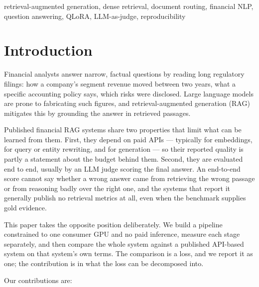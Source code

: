 \documentclass[conference]{IEEEtran}
\begin{document}
\begin{IEEEkeywords}
retrieval-augmented generation, dense retrieval, document routing, financial
NLP, question answering, QLoRA, LLM-as-judge, reproducibility
\end{IEEEkeywords}

\section{Introduction}
Financial analysts answer narrow, factual questions by reading long regulatory
filings: how a company's segment revenue moved between two years, what a
specific accounting policy says, which risks were disclosed. Large language
models are prone to fabricating such figures, and retrieval-augmented
generation (RAG)~\cite{lewis2020rag} mitigates this by grounding the answer in
retrieved passages.

Published financial RAG systems share two properties that limit what can be
learned from them. First, they depend on paid APIs --- typically for
embeddings, for query or entity rewriting, and for generation --- so their
reported quality is partly a statement about the budget behind them. Second,
they are evaluated end to end, usually by an LLM judge scoring the final
answer. An end-to-end score cannot say whether a wrong answer came from
retrieving the wrong passage or from reasoning badly over the right one, and
the systems that report it generally publish no retrieval metrics at all, even
when the benchmark supplies gold evidence.

This paper takes the opposite position deliberately. We build a pipeline
constrained to one consumer GPU and no paid inference, measure each stage
separately, and then compare the whole system against a published API-based
system on that system's own terms. The comparison is a loss, and we report it
as one; the contribution is in what the loss can be decomposed into.

Our contributions are:
\end{document}
